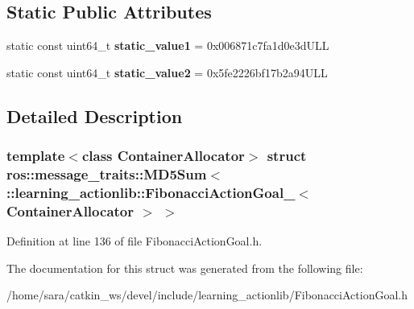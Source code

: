 \subsection*{Static Public Attributes}
\begin{DoxyCompactItemize}
\item 
\mbox{\label{structros_1_1message__traits_1_1MD5Sum_3_01_1_1learning__actionlib_1_1FibonacciActionGoal___3_01ContainerAllocator_01_4_01_4_aac159bc07df636751f59cd11aadca047}} 
static const uint64\+\_\+t {\bfseries static\+\_\+value1} = 0x006871c7fa1d0e3d\+U\+LL
\item 
\mbox{\label{structros_1_1message__traits_1_1MD5Sum_3_01_1_1learning__actionlib_1_1FibonacciActionGoal___3_01ContainerAllocator_01_4_01_4_a86f9de8615a6735f465ce573283bb5bc}} 
static const uint64\+\_\+t {\bfseries static\+\_\+value2} = 0x5fe2226bf17b2a94\+U\+LL
\end{DoxyCompactItemize}


\subsection{Detailed Description}
\subsubsection*{template$<$class Container\+Allocator$>$\newline
struct ros\+::message\+\_\+traits\+::\+M\+D5\+Sum$<$ \+::learning\+\_\+actionlib\+::\+Fibonacci\+Action\+Goal\+\_\+$<$ Container\+Allocator $>$ $>$}



Definition at line 136 of file Fibonacci\+Action\+Goal.\+h.



The documentation for this struct was generated from the following file\+:\begin{DoxyCompactItemize}
\item 
/home/sara/catkin\+\_\+ws/devel/include/learning\+\_\+actionlib/Fibonacci\+Action\+Goal.\+h\end{DoxyCompactItemize}
